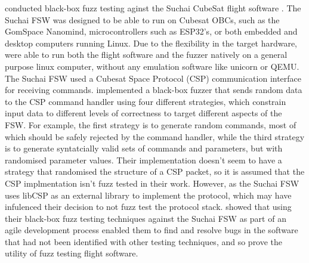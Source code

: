 \documentclass[../report.tex]{subfiles}
\begin{document}
\citet{Gutierrez_2021} conducted black-box fuzz testing aginst the Suchai
CubeSat flight software \citep{Suchai_FSW}. The Suchai FSW was designed to be
able to run on Cubesat OBCs, such as the GomSpace Nanomind, microcontrollers
such as ESP32's, or both embedded and desktop computers running Linux. Due to
the flexibility in the target hardware, \citet{Gutierrez_2021} were able to
run both the flight software and the fuzzer natively on a general purpose linux
computer, without any emulation software like unicorn or QEMU. The Suchai FSW
used a Cubesat Space Protocol (CSP) communication interface for receiving
commands. \citet{Gutierrez_2021} implemented a black-box fuzzer that sends
random data to the CSP command handler using four different strategies, which
constrain input data to different levels of correctness to target different
aspects of the FSW. For example, the first strategy is to generate random
commands, most of which should be safely rejected by the command handler, while
the third strategy is to generate syntatcially valid sets of commands and
parameters, but with randomised parameter values. Their implementation doesn't
seem to have a strategy that randomised the structure of a CSP packet, so it is
assumed that the CSP implmentation isn't fuzz tested in their work. However, as
the Suchai FSW uses libCSP as an external library to implement the protocol,
which may have infulenced their decision to not fuzz test the protocol stack.
\citet{Gutierrez_2021} showed that using their black-box fuzz testing
techniques against the Suchai FSW as part of an agile development process
enabled them to find and resolve bugs in the software that had not been
identified with other testing techniques, and so prove the utility of fuzz
testing flight software. %
\end{document}
